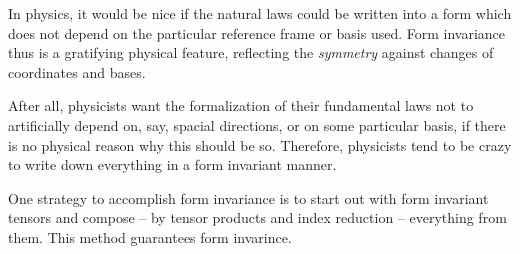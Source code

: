 In physics, it would be nice if the natural laws could be written into a
form which does not depend on the particular reference frame or  basis
used.
Form invariance thus is a gratifying physical feature, reflecting the
{\em symmetry} against changes of coordinates and bases.

After all, physicists want the formalization of their fundamental laws not to artificially depend on,
say, spacial directions, or on some particular basis, if there is no physical reason why this should be so.
Therefore, physicists tend to be crazy to write down everything in a
form invariant manner.

One strategy to accomplish  form invariance  is to start out with form invariant
tensors and compose -- by tensor products and index reduction -- everything from them. This method guarantees form
invarince.



